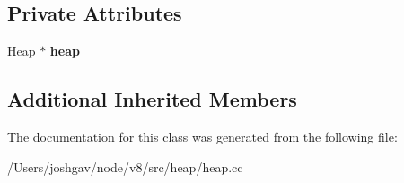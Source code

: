 \subsection*{Private Attributes}
\begin{DoxyCompactItemize}
\item 
\hyperlink{classv8_1_1internal_1_1_heap}{Heap} $\ast$ {\bfseries heap\+\_\+}\hypertarget{classv8_1_1internal_1_1_memory_pressure_interrupt_task_a461829bba9baa923bf59f939662d3f02}{}\label{classv8_1_1internal_1_1_memory_pressure_interrupt_task_a461829bba9baa923bf59f939662d3f02}

\end{DoxyCompactItemize}
\subsection*{Additional Inherited Members}


The documentation for this class was generated from the following file\+:\begin{DoxyCompactItemize}
\item 
/\+Users/joshgav/node/v8/src/heap/heap.\+cc\end{DoxyCompactItemize}
